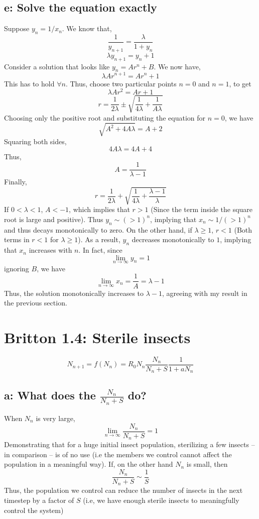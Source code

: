 \documentclass[english]{article}
\begin{document}
\subsection*{e: Solve the equation exactly}
Suppose $y_n = 1/x_n$. We know that,
$$ \frac{1}{y_{n+1}} = \frac{\lambda}{1+y_n}$$
$$ \lambda y_{n+1} = y_n + 1$$
Consider a solution that looks like $y_n = Ar^{n} + B$. We now have,
$$ \lambda Ar^{n+1} = Ar^{n} + 1$$
This has to hold $\forall n$. Thus, choose two particular points $n=0$ and
$n=1$, to get
$$ \lambda Ar^{2} = Ar + 1 $$
$$ r = \frac{1}{2\lambda} \pm \sqrt{\frac{1}{4\lambda} + \frac{1}{A\lambda}}$$
Choosing only the positive root and substituting the equation for $n=0$, 
we have
$$ \sqrt{A^{2} + 4A\lambda} = A+2$$
Squaring both sides,
$$ 4A\lambda = 4A+4 $$
Thus,
$$ A = \frac{1}{\lambda-1}$$
Finally, 
$$ r = \frac{1}{2\lambda} + \sqrt{\frac{1}{4\lambda} + \frac{\lambda -1}{\lambda}}$$
If $0 < \lambda < 1$, $A < -1$, which implies that $r > 1$ (Since the term inside
the square root is large and positive). Thus $y_n \sim (>1)^{n}$, implying that
$x_n \sim 1/(>1)^{n}$ and thus decays monotonically to zero. 
On the other hand, if $\lambda \geq 1$, $r < 1$ (Both terms in $r<1$ for $\lambda \geq 1$). 
As a result, $y_n$ decreases monotonically to $1$, implying that $x_n$ increases 
with $n$. In fact, since
$$ \lim _{n\rightarrow \infty} y_n = 1 $$
ignoring $B$, we have
$$ \lim _{n\rightarrow \infty} x_n = \frac{1}{A} = \lambda -1$$
Thus, the solution monotonically increases to $\lambda -1$, agreeing with my result
in the previous section.

\section{Britton 1.4: Sterile insects}
\begin{equation}
	N_{n+1} = f(N_n) = R_0N_n\frac{N_n}{N_n+S}\frac{1}{1+aN_n}
	\label{eq:problem3}
\end{equation}
\subsection*{a: What does the $\frac{N_n}{N_n+S}$ do?}
When $N_n$ is very large,
$$ \lim _{n\rightarrow \infty}\frac{N_n}{N_n+S} = 1 $$
Demonstrating that for a huge initial insect population, sterilizing a few insects
-- in comparison -- is of no use (i.e the members we control cannot affect the
population in a meaningful way).
If, on the other hand $N_n$ is small, then
$$ \frac{N_n}{N_n+S} \sim \frac{1}{S} $$
Thus, the population we control can reduce the number of insects in the next
timestep by a factor of $S$ (i.e, we have enough sterile insects to meaningfully
control the system)
\end{document}
